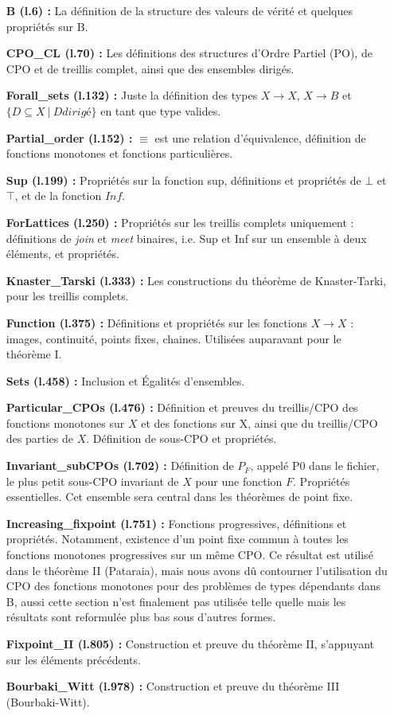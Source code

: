 \documentclass{article}
\newcommand\code[1]{{\fontfamily{lmtt}\selectfont #1}}
\theoremstyle{definition}
\begin{document}
\begin{itemize}
\item[\textbf{B (l.6) :}] La définition de la structure des valeurs de vérité et quelques propriétés sur B.
\item[\textbf{CPO\_CL (l.70) :}] Les définitions des structures d'Ordre Partiel (PO), de CPO et de treillis complet, ainsi que des ensembles dirigés.
\item[\textbf{Forall\_sets (l.132) :}] Juste la définition des types $X \rightarrow X$, $X \rightarrow B$ et $\{ D \subseteq X ~ | ~ D dirigé \}$ en tant que type valides.
\item[\textbf{Partial\_order (l.152) :}] $\equiv$ est une relation d'équivalence, définition de fonctions monotones et fonctions particulières.
\item[\textbf{Sup (l.199) :}] Propriétés sur la fonction sup, définitions et propriétés de $\bot$ et $\top$, et de la fonction $Inf$.
\item[\textbf{ForLattices (l.250) :}] Propriétés sur les treillis complets uniquement : définitions de \textit{join} et \textit{meet} binaires, i.e. Sup et Inf sur un ensemble à deux éléments, et propriétés.
\item[\textbf{Knaster\_Tarski (l.333) :}] Les constructions du théorème de Knaster-Tarki, pour les treillis complets.
\item[\textbf{Function (l.375) :}] Définitions et propriétés sur les fonctions $X \rightarrow X$ : images, continuité, points fixes, chaines. Utilisées auparavant pour le théorème I.
\item[\textbf{Sets (l.458) :}] Inclusion et Égalités d'ensembles.
\item[\textbf{Particular\_CPOs (l.476) :}] Définition et preuves du treillis/CPO des fonctions monotones sur $X$ et des fonctions sur X, ainsi que du treillis/CPO des parties de $X$. Définition de sous-CPO et propriétés.
\item[\textbf{Invariant\_subCPOs (l.702) :}] Définition de $P_F$, appelé \code{P0} dans le fichier, le plus petit sous-CPO invariant de $X$ pour une fonction $F$. Propriétés essentielles. Cet ensemble sera central dans les théorèmes de point fixe.
\item[\textbf{Increasing\_fixpoint (l.751) :}] Fonctions progressives, définitions et propriétés. Notamment, existence d'un point fixe commun à toutes les fonctions monotones progressives sur un même CPO. Ce résultat est utilisé dans le théorème II (Pataraia), mais nous avons dû contourner l'utilisation du CPO des fonctions monotones pour des problèmes de types dépendants dans B, aussi cette section n'est finalement pas utilisée telle quelle mais les résultats sont reformulée plus bas sous d'autres formes.
\item[\textbf{Fixpoint\_II (l.805) :}] Construction et preuve du théorème II, s'appuyant sur les éléments précédents.
\item[\textbf{Bourbaki\_Witt (l.978) :}] Construction et preuve du théorème III (Bourbaki-Witt).
\end{itemize}
\end{document}
